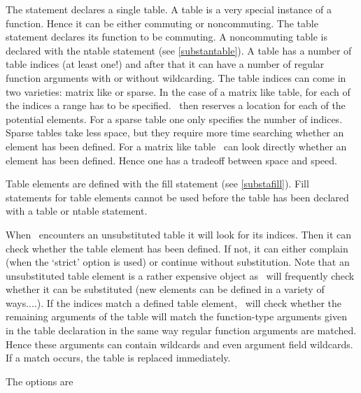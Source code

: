 \noindent The statement declares a single table. A table is a 
very special instance of a function. Hence it can be either 
commuting or noncommuting. The table 
statement declares its function to be commuting. A noncommuting table is 
declared with the ntable statement (see \ref{substantable}). A 
table has a number of table indices (at least one!) 
and after that it can have a number of regular function arguments with or 
without wildcarding. The table indices can come in two varieties: 
matrix like or sparse. In the case of a 
matrix like table, for each of the indices a range 
has to be specified. \FORM\ then reserves a location for each of the 
potential elements. For a sparse table one only 
specifies the number of indices. Sparse tables take less space, but they 
require more time searching whether an element has been defined. For a 
matrix like table \FORM\ can look directly whether an element has been 
defined. Hence one has a tradeoff between space and speed.\vspace{4mm}

\noindent Table elements are defined with the fill statement (see 
\ref{substafill}). Fill statements for table elements cannot be used before 
the table has been declared with a table or ntable statement.\vspace{4mm}

\noindent When \FORM\ encounters an unsubstituted table it will look for its 
indices. Then it can check whether the table element has been defined. If 
not, it can either complain (when the `strict' option is 
used) or continue without substitution. Note that an unsubstituted table 
element is a rather expensive object as \FORM\ will frequently check whether 
it can be substituted (new elements can be defined in a variety of 
ways....). If the indices match a defined table element, \FORM\ will check 
whether the remaining arguments of the table will match the function-type 
arguments given in the table declaration in the same way regular function 
arguments are matched. Hence these arguments can contain 
wildcards and even argument field 
wildcards. If a match occurs, the table is replaced immediately.

\noindent The options are


